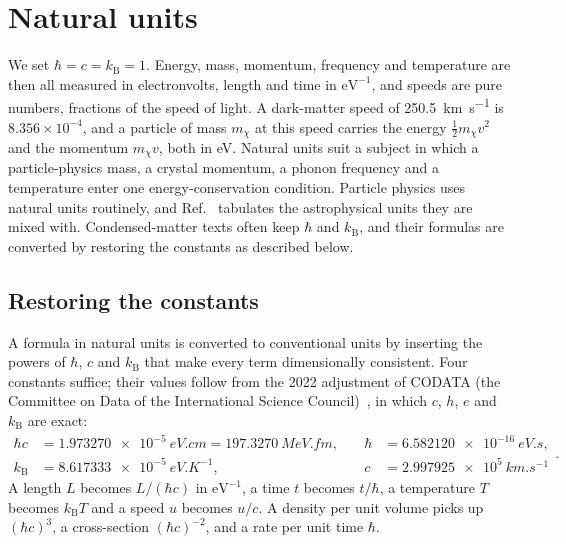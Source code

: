 \section{Natural units}\label{app:A.1}

We set $\hbar = c = k_{\mathrm{B}} = 1$. Energy, mass, momentum, frequency and temperature are then all measured in electronvolts, length and time in $\mathrm{eV}^{-1}$, and speeds are pure numbers, fractions of the speed of light. A dark-matter speed of \SI{250.5}{km.s^{-1}} is $8.356\times10^{-4}$, and a particle of mass $m_\chi$ at this speed carries the energy $\tfrac12 m_\chi v^2$ and the momentum $m_\chi v$, both in eV. Natural units suit a subject in which a particle-physics mass, a crystal momentum, a phonon frequency and a temperature enter one energy-conservation condition. Particle physics uses natural units routinely, and Ref.~\cite[Appendix~A, Table~III]{lin2019tasi} tabulates the astrophysical units they are mixed with. Condensed-matter texts often keep $\hbar$ and $k_{\mathrm{B}}$, and their formulas are converted by restoring the constants as described below.

\subsection{Restoring the constants}

A formula in natural units is converted to conventional units by inserting the powers of $\hbar$, $c$ and $k_{\mathrm{B}}$ that make every term dimensionally consistent. Four constants suffice; their values follow from the 2022 adjustment of CODATA (the Committee on Data of the International Science Council)~\cite{mohr2025codata}, in which $c$, $h$, $e$ and $k_{\mathrm{B}}$ are exact:
\begin{equation}
  \begin{aligned}
  \hbar c &= \SI{1.973270e-5}{eV.cm} = \SI{197.3270}{MeV.fm}, &\quad \hbar &= \SI{6.582120e-16}{eV.s},\\
  k_{\mathrm{B}} &= \SI{8.617333e-5}{eV.K^{-1}}, &\quad c &= \SI{2.997925e5}{km.s^{-1}}
  \end{aligned}.
  \label{eq:A.1-constants}
\end{equation}
A length $L$ becomes $L/(\hbar c)$ in $\mathrm{eV}^{-1}$, a time $t$ becomes $t/\hbar$, a temperature $T$ becomes $k_{\mathrm{B}}T$ and a speed $u$ becomes $u/c$. A density per unit volume picks up $(\hbar c)^3$, a cross-section $(\hbar c)^{-2}$, and a rate per unit time $\hbar$.

